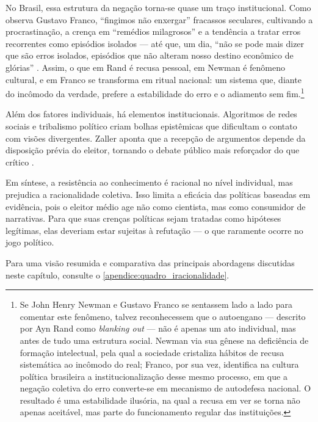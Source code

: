 No Brasil, essa estrutura da negação torna-se quase um traço institucional. Como observa Gustavo Franco, “fingimos não enxergar” fracassos seculares, cultivando a procrastinação, a crença em “remédios milagrosos” e a tendência a tratar erros recorrentes como episódios isolados — até que, um dia, “não se pode mais dizer que são erros isolados, episódios que não alteram nosso destino econômico de glórias” \cite[p.~38-39]{franco2021licoes}. Assim, o que em Rand é recusa pessoal, em Newman é fenômeno cultural, e em Franco se transforma em ritual nacional: um sistema que, diante do incômodo da verdade, prefere a estabilidade do erro e o adiamento sem fim.\footnote{Se John Henry Newman e Gustavo Franco se sentassem lado a lado para comentar este fenômeno, talvez reconhecessem que o autoengano — descrito por Ayn Rand como \textit{blanking out} — não é apenas um ato individual, mas antes de tudo uma estrutura social. Newman via sua gênese na deficiência de formação intelectual, pela qual a sociedade cristaliza hábitos de recusa sistemática ao incômodo do real; Franco, por sua vez, identifica na cultura política brasileira a institucionalização desse mesmo processo, em que a negação coletiva do erro converte-se em mecanismo de autodefesa nacional. O resultado é uma estabilidade ilusória, na qual a recusa em ver se torna não apenas aceitável, mas parte do funcionamento regular das instituições.}

Além dos fatores individuais, há elementos institucionais. Algoritmos de redes sociais e tribalismo político criam bolhas epistêmicas que dificultam o contato com visões divergentes. Zaller aponta que a recepção de argumentos depende da disposição prévia do eleitor, tornando o debate público mais reforçador do que crítico \cite{zaller1992nature}.

Em síntese, a resistência ao conhecimento é racional no nível individual, mas prejudica a racionalidade coletiva. Isso limita a eficácia das políticas baseadas em evidência, pois o eleitor médio age não como cientista, mas como consumidor de narrativas. Para que suas crenças políticas sejam tratadas como hipóteses legítimas, elas deveriam estar sujeitas à refutação — o que raramente ocorre no jogo político.


Para uma visão resumida e comparativa das principais abordagens discutidas neste capítulo, consulte o \autoref{apendice:quadro_iracionalidade}.

